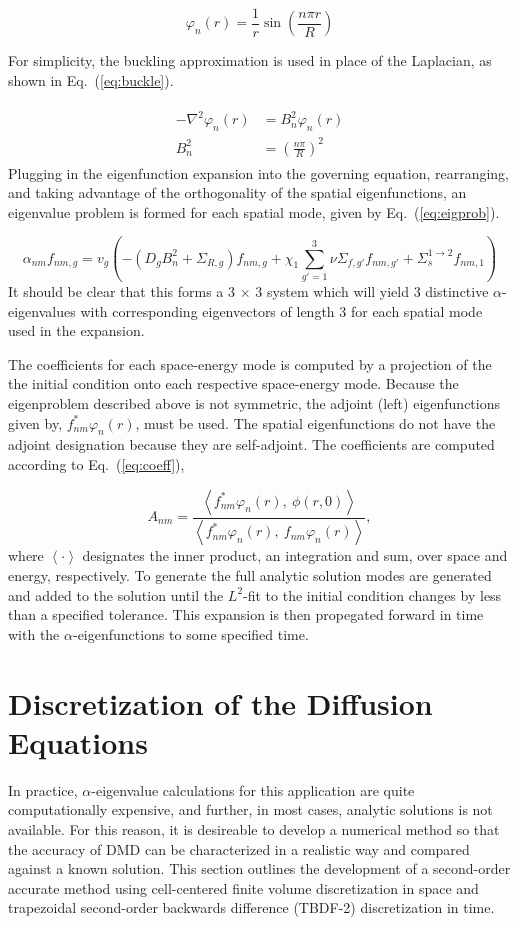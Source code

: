 \documentclass[12pt]{article}
\newcommand{\fn}[1]{\left( #1 \right)}
\newcommand{\ave}[1]{\left\langle #1 \right\rangle}
\newcommand{\bea}{\begin{eqnarray}}
\newcommand{\eea}{\end{eqnarray}}
\newcommand{\be}{\begin{equation}}
\newcommand{\ee}{\end{equation}}
\newcommand{\LEQ}[1]{\label{eq:#1}}
\newcommand{\EQ}[1]{Eq.~(\ref{eq:#1})}
\begin{document}
\be
	\varphi_n(r) = \frac{1}{r} \sin\fn{ \frac{n \pi r}{R} }
	\LEQ{eigfunc}
\ee

For simplicity, the buckling approximation is used in place of the Laplacian, 
	as shown in \EQ{buckle}.

\bea 
	\begin{aligned}
		- \nabla^2 \varphi_n(r) &= B_n^2 \varphi_n(r) \\
	 	B_n^2 &= \fn{ \frac{n \pi}{R} }^2
	\end{aligned} 
	\LEQ{buckle} 
\eea
Plugging in the eigenfunction expansion into the governing equation, 
	rearranging, and taking advantage of the orthogonality of the spatial 
	eigenfunctions, an eigenvalue problem is formed for each spatial mode, given 
	by \EQ{eigprob}.

\be
	\alpha_{nm} f_{nm, g} = v_g \fn{ - \fn{ D_g B_n^2 + \Sigma_{R,g} }f_{nm, g} 
		+ \chi_1 \sum_{g' = 1}^{3} \nu\Sigma_{f,g'} f_{nm, g'} 
		+ \Sigma_s^{1 \rightarrow 2} f_{nm, 1} } 
	\LEQ{eigprob}
\ee
It should be clear that this forms a 3 $\times$ 3 system which will yield 3 
	distinctive $\alpha$-eigenvalues with corresponding eigenvectors of length 3 
	for each spatial mode used in the expansion.

The coefficients for each space-energy mode is computed by a projection of the 
	the initial condition onto each respective space-energy mode. 
Because the eigenproblem described above is not symmetric, the adjoint (left) 
	eigenfunctions given by, $f_{nm}^* \varphi_n(r)$, must be used. 
The spatial eigenfunctions do not have the adjoint designation because they are 
	self-adjoint. 
The coefficients are computed according to \EQ{coeff},

\be
	A_{nm} = \frac{\ave{ f_{nm}^* \varphi_n(r), \ \phi(r, 0)}}{\ave{f_{nm}^* 	
			\varphi_n(r), \ f_{nm} \varphi_n(r)}},
	\LEQ{coeff} 
\ee
where $\ave{\cdot}$ designates the inner product, an integration and sum, over 
	space and energy, respectively. 
To generate the full analytic solution modes are generated and added to the 
	solution until the $L^2$-fit to the initial condition changes by less than a 
	specified tolerance. 
This expansion is then propegated forward in time with the
	$\alpha$-eigenfunctions to some specified time.

\section{Discretization of the Diffusion Equations}
In practice,  $\alpha$-eigenvalue calculations for this application are quite 
	computationally expensive, and  further, in most cases, analytic solutions is 
	not available. 
For this reason, it is desireable to develop a numerical method so that the 
	accuracy of DMD can be characterized in a realistic way and compared against 
	a known solution. 
This section outlines the development of a second-order accurate method using 
	cell-centered finite volume discretization in space and trapezoidal 
	second-order backwards difference (TBDF-2) discretization in time.
\end{document}
